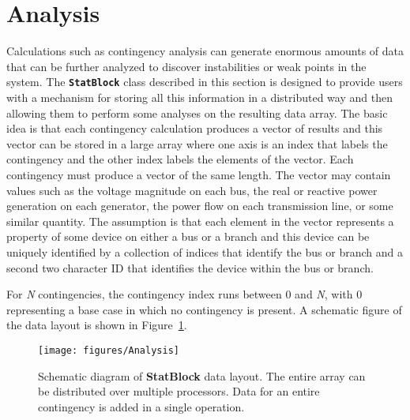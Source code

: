 \section{Analysis}\label{analysis}

Calculations such as contingency analysis can generate enormous amounts of data
that can be further analyzed to discover instabilities or weak points in the
system. The \texttt{\textbf{StatBlock}} class described in this section is
designed to provide users with a mechanism for storing all this information in a
distributed way and then allowing them to perform some analyses on the resulting data array. The basic idea is that each contingency calculation produces a vector of results and this vector can be stored in a large array where one axis is an index that labels the contingency and the other index labels the elements of the vector. Each contingency must produce a vector of the same length. The vector may contain values such as the voltage magnitude on each bus, the real or reactive power generation on each generator, the power flow on each transmission line, or some similar quantity. The assumption is that each element in the vector represents a property of some device on either a bus or a branch and this device can be uniquely identified by a collection of indices that identify the bus or branch and a second two character ID that identifies the device within the bus or branch.

For \textit{N} contingencies, the contingency index runs between 0 and
\textit{N}, with 0 representing a base case in which no contingency is present.
A schematic figure of the data layout is shown in Figure~\ref{fig:analysis}.

\begin{figure}
  \centering
    \texttt{[image: figures/Analysis]}
  \caption{Schematic diagram of \textbf{StatBlock} data layout. The entire array can be distributed over multiple processors. Data for an entire contingency is added in a single operation.}
  \label{fig:analysis}
\end{figure}



